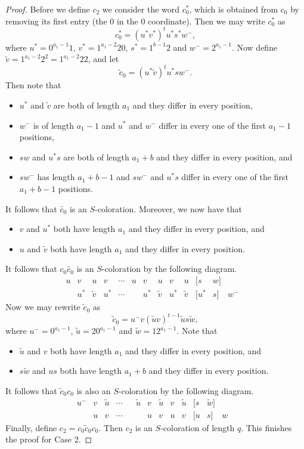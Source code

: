 \documentclass[11pt]{amsart}
\theoremstyle{definition}
\begin{document}
\begin{proof}
Before we define $c_2$ we consider the word $c_0^*$, which is obtained from $c_0$ by removing its first entry (the $0$ in the $0$ coordinate). Then we may write $c_0^*$ as
$$ c_0^*=(u^*v^*)^t u^*s^*w^-, $$
where $u^*=0^{a_1-1}1$, $v^*=1^{a_1-2}20$, $s^*=1^{b-1}2$ and $w^-=2^{a_1-1}$. Now define $\tilde{v}=1^{a_1-2}2^2=1^{a_1-2}22$, and let
$$ \tilde{c}_0=(u^*\tilde{v})^tu^*sw^-. $$
Then note that 
\begin{itemize}
\item $u^*$ and $\tilde{v}$ are both of length $a_1$ and they differ in every position, 
\item $w^-$ is of length $a_1-1$ and $u^*$ and $w^-$ differ in every one of the first $a_1-1$ positions, 
\item $sw$ and $u^*s$ are both of length $a_1+b$ and they differ in every position, and
\item $sw^-$ has length $a_1+b-1$ and $sw^-$ and $u^*s$ differ in every one of the first $a_1+b-1$ positions.
\end{itemize}
It follows that $\tilde{c_0}$ is an $S$-coloration. Moreover, we now have that 
\begin{itemize}
\item $v$ and $u^*$ both have length $a_1$ and they differ in every position, and
\item $u$ and $\tilde{v}$ both have length $a_1$ and they differ in every position.  
\end{itemize}
It follows that $c_0\tilde{c_0}$ is an $S$-coloration by the following diagram.
$$  \begin{array}{rccccccccccccl}
u & v & u & v & \cdots & u & v & u & v & u & [s & w] &  & \\
   & u^* & \tilde{v} & u^* & \cdots &    & u^* & \tilde{v} & u^* & \tilde{v} & [u^* & s] & w^- & 
      \end{array}
   $$
Now we may rewrite $\tilde{c}_0$ as
$$ \tilde{c}_0=u^{-}v(\tilde{u}v)^{t-1}\tilde{u}s\tilde{w}, $$
where $u^{-}=0^{a_1-1}$, $\tilde{u}=20^{a_1-1}$ and $\tilde{w}=12^{a_1-1}$. Note that
\begin{itemize}
\item $\tilde{u}$ and $v$ both have length $a_1$ and they differ in every position, and
\item $s\tilde{w}$ and $us$ both have length $a_1+b$ and they differ in every position.
\end{itemize}
It follows that $\tilde{c}_0c_0$ is also an $S$-coloration by the following diagram.
$$  \begin{array}{rccccccccccccl}
    u^{-} & v& \tilde{u} & \cdots &    & \tilde{u} &v & \tilde{u} & v & \tilde{u} & [s & \tilde{w}] & \\  
& u & v & \cdots &  & & u & v & u & v & [u & s] & w &       \end{array}
   $$
Finally, define $c_2=c_0\tilde{c}_0c_0$. Then $c_2$ is an $S$-coloration of length $q$. This finishes the proof for Case 2.



\end{proof}
\end{document}
